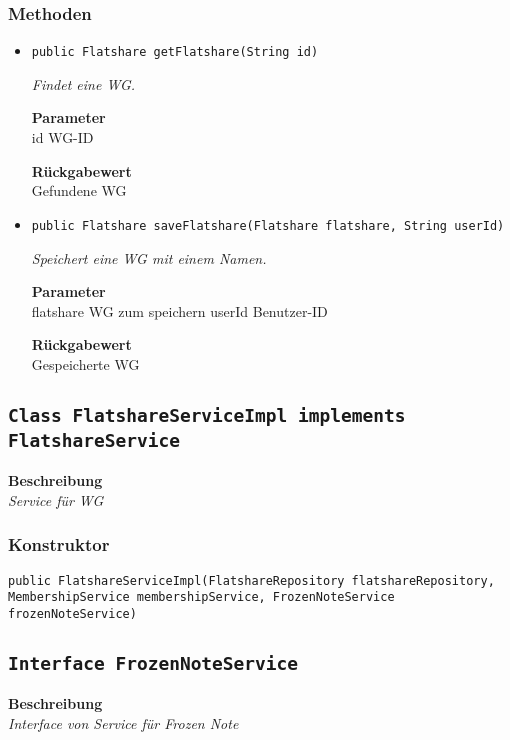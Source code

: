     \subsubsection*{Methoden}
    \begin{itemize}
    	\item{\texttt{public Flatshare getFlatshare(String id)}}
    	
    	\textit{Findet eine WG.}
    	
    	\textbf{Parameter} \\
    	id WG-ID
    	
    	\textbf{Rückgabewert} \\
    	Gefundene WG        \item{\texttt{public Flatshare saveFlatshare(Flatshare flatshare, String userId)}}
    	
    	\textit{Speichert eine WG mit einem Namen.}
    	
    	\textbf{Parameter} \\
    	flatshare WG zum speichern
    	userId Benutzer-ID
    	
    	\textbf{Rückgabewert} \\
    	Gespeicherte WG
    \end{itemize}
    \subsection{\texttt{Class FlatshareServiceImpl implements FlatshareService}}
    \textbf{Beschreibung} \\
    \textit{Service für WG}
    \subsubsection*{Konstruktor}
    \texttt{public FlatshareServiceImpl(FlatshareRepository flatshareRepository, MembershipService membershipService, FrozenNoteService frozenNoteService)}
    \subsection{\texttt{Interface FrozenNoteService}}
    \textbf{Beschreibung} \\
    \textit{Interface von Service für Frozen Note}
